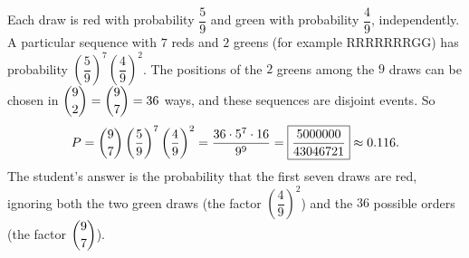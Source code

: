 Each draw is red with probability $\dfrac59$ and green with probability $\dfrac49$, independently. A particular sequence with $7$ reds and $2$ greens (for example RRRRRRRGG) has probability $\left(\dfrac59\right)^7\left(\dfrac49\right)^2$. The positions of the $2$ greens among the $9$ draws can be chosen in $\dbinom92=\dbinom97=36$ ways, and these sequences are disjoint events. So
\[P=\dbinom97\left(\dfrac59\right)^7\left(\dfrac49\right)^2=\dfrac{36\cdot5^7\cdot16}{9^9}=\boxed{\dfrac{5000000}{43046721}}\approx0.116.\]
The student's answer is the probability that the first seven draws are red, ignoring both the two green draws (the factor $\left(\dfrac49\right)^2$) and the $36$ possible orders (the factor $\dbinom97$).
